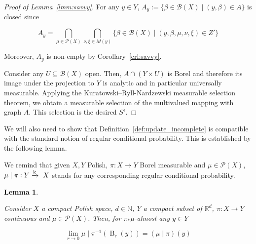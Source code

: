 \documentclass[11pt]{article}
\theoremstyle{definition}
\theoremstyle{plain}
\newtheorem{lemma}{Lemma}%
\newcommand{\Nats}{\mathbb{N}}
\newcommand{\Reals}{\mathbb{R}}
\newcommand{\B}{\operatorname{B}}
\newcommand{\M}{\xrightarrow{\textnormal{k}}}
\newcommand{\PM}{\mathcal{P}}
\newcommand{\Gm}{\mathcal{B}}
\begin{document}
\begin{proof}[Proof of Lemma~\ref{lmm:savvy}]
For any $y \in Y$, $A_y:=\{\beta \in \Gm(X) \mid (y,\beta) \in A\}$ is closed since

$$A_y = \bigcap_{\mu \in \PM(X)} \bigcap_{\nu,\xi \in M(y)} \{\beta \in \Gm(X) \mid (y,\beta,\mu,\nu,\xi) \in Z'\}$$

Moreover, $A_y$ is non-empty by Corollary~\ref{crl:savvy}.

Consider any $U \subseteq \Gm(X)$ open. Then, $A \cap (Y \times U)$ is Borel and therefore its image under the projection to $Y$ is analytic and in particular universally measurable. Applying the Kuratowski--Ryll-Nardzewski measurable selection theorem, we obtain a measurable selection of the multivalued mapping with graph $A$. This selection is the desired $S^\epsilon$.
\end{proof}

We will also need to show that Definition~\ref{def:update_incomplete} is compatible with the standard notion of regular conditional probability. This is established by the following lemma.

We remind that given $X,Y$ Polish, $\pi: X \rightarrow Y$ Borel measurable and $\mu \in \PM(X)$, $\mu \mid \pi: Y \M\ X$ stands for any corresponding regular conditional probability.

\begin{samepage}
\begin{lemma}
\label{lmm:update_incomplete}

Consider $X$ a compact Polish space, $d \in \Nats$, $Y$ a compact subset of $\Reals^d$, $\pi: X \rightarrow Y$ continuous and $\mu \in \PM(X)$. Then, for $\pi_*\mu$-almost any $y \in Y$

\begin{equation}
\lim_{r \rightarrow 0}{\mu \mid \pi^{-1}(\B_r(y)) = (\mu \mid \pi)(y)}
\end{equation}

\end{lemma}
\end{samepage}
\end{document}
